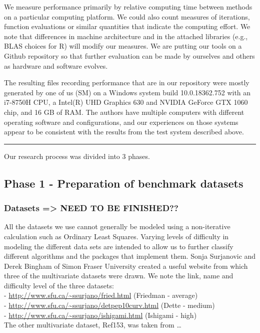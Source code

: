 We measure performance primarily by relative computing time between
methods on a particular computing platform. We could also count measures
of iterations, function evaluations or similar quantities that indicate
the computing effort. We note that differences in machine architecture
and in the attached libraries (e.g., BLAS choices for R) will modify our
measures. We are putting our tools on a Github repository so that
further evaluation can be made by ourselves and others as hardware and
software evolves.

The resulting files recording performance that are in our repository
were mostly generated by one of us (SM) on a Windows system build
10.0.18362.752 with an i7-8750H CPU, a Intel(R) UHD Graphics 630 and
NVIDIA GeForce GTX 1060 chip, and 16 GB of RAM. The authors have
multiple computers with different operating software and configurations,
and our experiences on those systems appear to be consistent with the
results from the test system described above.

\begin{center}\rule{0.5\linewidth}{0.5pt}\end{center}

Our research process was divided into 3 phases.

\hypertarget{phase-1---preparation-of-benchmark-datasets}{%
\subsection{Phase 1 - Preparation of benchmark
datasets}\label{phase-1---preparation-of-benchmark-datasets}}

\hypertarget{datasets-need-to-be-finished}{%
\subsubsection{Datasets =\textgreater{} NEED TO BE
FINISHED??}\label{datasets-need-to-be-finished}}

All the datasets we use cannot generally be modeled using a
non-iterative calculation such as Ordinary Least Squares. Varying levels
of difficulty in modeling the different data sets are intended to allow
us to further classify different algorithms and the packages that
implement them. Sonja Surjanovic and Derek Bingham of Simon Fraser
University created a useful website from which three of the multivariate
datasets were drawn. We note the link, name and difficulty level of the
three datasets:\\
- \url{http://www.sfu.ca/~ssurjano/fried.html} (Friedman - average)\\
- \url{http://www.sfu.ca/~ssurjano/detpep10curv.html} (Dette - medium)\\
- \url{http://www.sfu.ca/~ssurjano/ishigami.html} (Ishigami - high)\\
The other multivariate dataset, Ref153, was taken from \ldots{}

